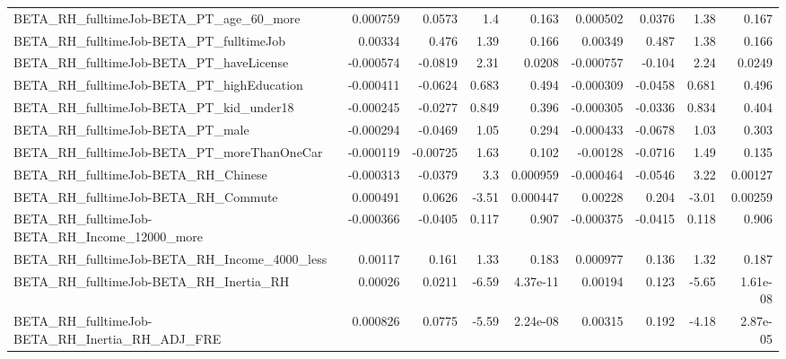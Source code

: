 \begin{tabular}{lrrrrrrrr}
BETA\_RH\_fulltimeJob-BETA\_PT\_age\_60\_more            &    0.000759 &       0.0573 &      1.4 &    0.163 &   0.000502 &      0.0376 &         1.38 &         0.167 \\
BETA\_RH\_fulltimeJob-BETA\_PT\_fulltimeJob            &     0.00334 &        0.476 &     1.39 &    0.166 &    0.00349 &       0.487 &         1.38 &         0.166 \\
BETA\_RH\_fulltimeJob-BETA\_PT\_haveLicense            &   -0.000574 &      -0.0819 &     2.31 &   0.0208 &  -0.000757 &      -0.104 &         2.24 &        0.0249 \\
BETA\_RH\_fulltimeJob-BETA\_PT\_highEducation          &   -0.000411 &      -0.0624 &    0.683 &    0.494 &  -0.000309 &     -0.0458 &        0.681 &         0.496 \\
BETA\_RH\_fulltimeJob-BETA\_PT\_kid\_under18            &   -0.000245 &      -0.0277 &    0.849 &    0.396 &  -0.000305 &     -0.0336 &        0.834 &         0.404 \\
BETA\_RH\_fulltimeJob-BETA\_PT\_male                   &   -0.000294 &      -0.0469 &     1.05 &    0.294 &  -0.000433 &     -0.0678 &         1.03 &         0.303 \\
BETA\_RH\_fulltimeJob-BETA\_PT\_moreThanOneCar         &   -0.000119 &     -0.00725 &     1.63 &    0.102 &   -0.00128 &     -0.0716 &         1.49 &         0.135 \\
BETA\_RH\_fulltimeJob-BETA\_RH\_Chinese                &   -0.000313 &      -0.0379 &      3.3 & 0.000959 &  -0.000464 &     -0.0546 &         3.22 &       0.00127 \\
BETA\_RH\_fulltimeJob-BETA\_RH\_Commute                &    0.000491 &       0.0626 &    -3.51 & 0.000447 &    0.00228 &       0.204 &        -3.01 &       0.00259 \\
BETA\_RH\_fulltimeJob-BETA\_RH\_Income\_12000\_more      &   -0.000366 &      -0.0405 &    0.117 &    0.907 &  -0.000375 &     -0.0415 &        0.118 &         0.906 \\
BETA\_RH\_fulltimeJob-BETA\_RH\_Income\_4000\_less       &     0.00117 &        0.161 &     1.33 &    0.183 &   0.000977 &       0.136 &         1.32 &         0.187 \\
BETA\_RH\_fulltimeJob-BETA\_RH\_Inertia\_RH             &     0.00026 &       0.0211 &    -6.59 & 4.37e-11 &    0.00194 &       0.123 &        -5.65 &      1.61e-08 \\
BETA\_RH\_fulltimeJob-BETA\_RH\_Inertia\_RH\_ADJ\_FRE     &    0.000826 &       0.0775 &    -5.59 & 2.24e-08 &    0.00315 &       0.192 &        -4.18 &      2.87e-05 \\

\end{tabular}
